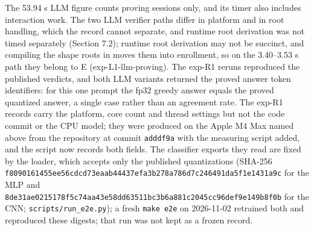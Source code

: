 \documentclass[11pt]{article}
\begin{document}
The 53.94 s LLM figure counts proving sessions only, and its timer also includes interaction work. The two LLM verifier paths differ in platform and in root handling, which the record cannot separate, and runtime root derivation was not timed separately (Section 7.2); runtime root derivation may not be succinct, and compiling the shape roots in moves them into enrollment, so on the 3.40--3.53 s path they belong to E (exp-L1-llm-proving). The exp-R1 reruns reproduced the published verdicts, and both LLM variants returned the proved answer token identifiers: for this one prompt the fp32 greedy answer equals the proved quantized answer, a single case rather than an agreement rate. The exp-R1 records carry the platform, core count and thread settings but not the code commit or the CPU model; they were produced on the Apple M4 Max named above from the repository at commit \texttt{adddf9a} with the measuring script added, and the script now records both fields. The classifier exports they read are fixed by the loader, which accepts only the published quantizations (SHA-256 \texttt{f8090161\allowbreak{}455ee56c\allowbreak{}dcd73eaa\allowbreak{}b44437ef\allowbreak{}a3b278a7\allowbreak{}86d7c246\allowbreak{}491da5f1\allowbreak{}e1431a9c} for the MLP and \texttt{8de31ae0\allowbreak{}215178f5\allowbreak{}c74aa43e\allowbreak{}58dd6351\allowbreak{}1bc3b6a8\allowbreak{}81c2045c\allowbreak{}c96def9e\allowbreak{}149b8f0b} for the CNN; \texttt{scripts/\allowbreak{}run\_e2e.\allowbreak{}py}); a fresh \texttt{make e2e} on 2026-11-02 retrained both and reproduced these digests; that run was not kept as a frozen record.
\end{document}
